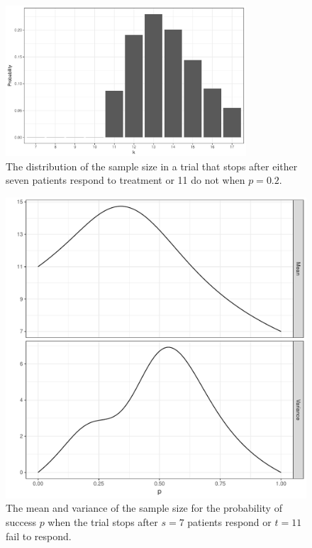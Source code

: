 \documentclass[sii]{ipart}
\begin{document}
\begin{figure}
\centering
\includegraphics[width=0.8\textwidth]{snb-first-plot.pdf}
\caption{
The distribution of the sample size in a trial that stops after either seven patients
respond to treatment or 11 do not when $p=0.2$.
}
\label{fig:kane_viz_1}
\end{figure}

\begin{figure}[htbp!]
\centering
\includegraphics[width=\textwidth]{mean-and-variance.pdf}
\caption{
The mean and variance of the sample size for the probability of success $p$ 
when the trial stops after $s=7$ patients respond or $t=11$ fail to respond.
}
\label{fig:kane_viz_2}
\end{figure}
\end{document}
